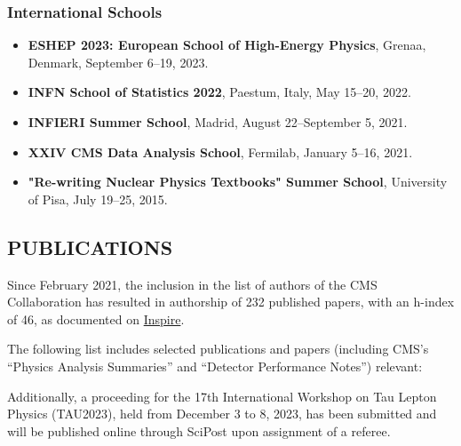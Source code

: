 \documentclass[12pt,a4paper,oneside]{extarticle}
\begin{document}
\subsubsection*{International Schools}
\begin{itemize}
    \item \textbf{ESHEP 2023: European School of High-Energy Physics}, Grenaa, Denmark, September 6–19, 2023.
    \item \textbf{INFN School of Statistics 2022}, Paestum, Italy, May 15–20, 2022.
    \item \textbf{INFIERI Summer School}, Madrid, August 22–September 5, 2021.
    \item \textbf{XXIV CMS Data Analysis School}, Fermilab, January 5–16, 2021.
    \item \textbf{"Re-writing Nuclear Physics Textbooks" Summer School}, University of Pisa, July 19–25, 2015.
\end{itemize}

\subsection*{PUBLICATIONS}
Since February 2021, the inclusion in the list of authors of the CMS Collaboration has resulted in authorship of 232 published papers, with an h-index of 46, as documented on \href{https://inspirehep.net/authors/1821915}{Inspire}.

The following list includes selected publications and papers (including CMS's ``Physics Analysis Summaries'' and ``Detector Performance Notes'') relevant:
\vspace{-1.5cm}


\nocite{bbttpaper}
\nocite{CMS-PAS-HIG-20-010}
\nocite{DAmante:2022xmb}
\nocite{CMS-DP-2023-024}

Additionally, a proceeding for the 17th International Workshop on Tau Lepton Physics (TAU2023), held from December 3 to 8, 2023, has been submitted and will be published online through SciPost upon assignment of a referee.\\

\end{document}
